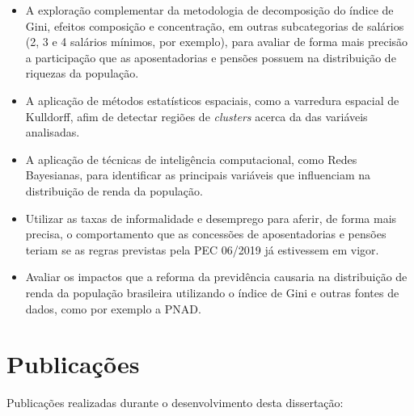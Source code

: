 \begin{itemize}
    \item A exploração complementar da metodologia de decomposição do índice de Gini, efeitos composição e concentração, em outras subcategorias de salários (2, 3 e 4 salários mínimos, por exemplo), para avaliar de forma mais precisão a participação que as aposentadorias e pensões possuem na distribuição de riquezas da população.
    
    \item A aplicação de métodos estatísticos espaciais, como a varredura espacial de Kulldorff, afim de detectar regiões de \textit{clusters} acerca da das variáveis analisadas.
    
    \item A aplicação de técnicas de inteligência computacional, como Redes Bayesianas, para identificar as principais variáveis que influenciam na distribuição de renda da população.
    
    \item Utilizar as taxas de informalidade e desemprego para aferir, de forma mais precisa, o comportamento que as concessões de aposentadorias e pensões teriam se as regras previstas pela PEC 06/2019 já estivessem em vigor.
    
    \item Avaliar os impactos que a reforma da previdência causaria na distribuição de renda da população brasileira utilizando o índice de Gini e outras fontes de dados, como por exemplo a PNAD. 
\end{itemize}

\section{Publicações}

Publicações realizadas durante o desenvolvimento desta dissertação:

